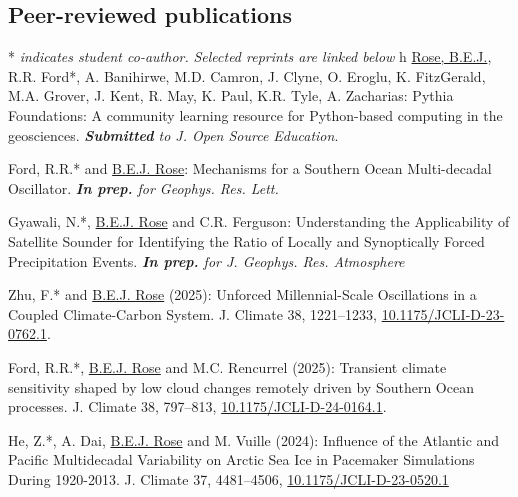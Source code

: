 \documentclass[11pt, letterpaper]{article} %
\newcommand{\years}[1]{\marginnote{\scriptsize #1}} %
\begin{document}
\subsection*{Peer-reviewed publications}
* \emph{indicates student co-author.} \emph{Selected reprints are linked below}
h
\years{2025}
\underline{Rose, B.E.J.}, R.R. Ford*, A. Banihirwe, M.D. Camron, J. Clyne, O. Eroglu, K. FitzGerald, M.A. Grover, J. Kent, R. May, K. Paul, K.R. Tyle, A. Zacharias: Pythia Foundations: A community learning resource for Python-based computing in the geosciences. \emph{\textbf{Submitted} to J. Open Source Education}.
\vspace{0.2 cm}

Ford, R.R.* and \underline{B.E.J. Rose}: Mechanisms for a Southern Ocean Multi-decadal Oscillator. \emph{\textbf{In prep.} for Geophys. Res. Lett.}
\vspace{0.2 cm}

Gyawali, N.*, \underline{B.E.J. Rose} and C.R. Ferguson: Understanding the Applicability of Satellite Sounder for Identifying the Ratio of Locally and Synoptically Forced Precipitation Events. \emph{\textbf{In prep.} for J. Geophys. Res. Atmosphere}
\vspace{0.2 cm}

Zhu, F.* and \underline{B.E.J. Rose} (2025): Unforced Millennial-Scale Oscillations in a Coupled Climate-Carbon System. J. Climate 38, 1221--1233, \href{https://doi.org/10.1175/JCLI-D-23-0762.1}{10.1175/JCLI-D-23-0762.1}.
\vspace{0.2 cm}

Ford, R.R.*, \underline{B.E.J. Rose} and M.C. Rencurrel (2025): Transient climate sensitivity shaped by low cloud changes remotely driven by Southern Ocean processes. J. Climate 38, 797--813, \href{https://doi.org/10.1175/JCLI-D-24-0164.1}{10.1175/JCLI-D-24-0164.1}.
\vspace{0.2 cm}

\years{2024}

He, Z.*, A. Dai, \underline{B.E.J. Rose} and M. Vuille (2024): Influence of the Atlantic and Pacific Multidecadal Variability on Arctic Sea Ice in Pacemaker Simulations During 1920-2013. J. Climate 37, 4481--4506, \href{https://doi.org/10.1175/JCLI-D-23-0520.1}{10.1175/JCLI-D-23-0520.1}
\vspace{0.2 cm}
\end{document}
